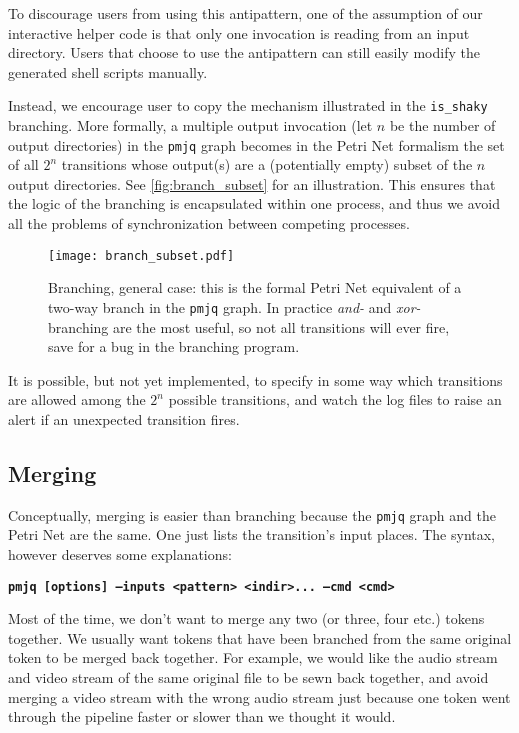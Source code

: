 \documentclass[letterpaper,twocolumn,10pt]{article}
\begin{document}
To discourage users from using this antipattern, one of the assumption of our interactive helper code is that only one invocation is reading from an input directory. Users that choose to use the antipattern can still easily modify the generated shell scripts manually.

Instead, we encourage user to copy the mechanism illustrated in the {\tt is\_shaky} branching. More formally, a multiple output invocation (let $n$ be the number of output directories) in the {\tt pmjq} graph becomes in the Petri Net formalism the set of all $2^n$ transitions whose output(s) are a (potentially empty) subset of the $n$ output directories. See \autoref{fig:branch_subset} for an illustration. This ensures that the logic of the branching is encapsulated within one process, and thus we avoid all the problems of synchronization between competing processes.


\begin{figure}[t]
\begin{center}
\texttt{[image: branch\_subset.pdf]}
\end{center}
\caption{Branching, general case: this is the formal Petri Net equivalent of a two-way branch in the {\tt pmjq} graph. In practice \emph{and-} and \emph{xor-}branching are the most useful, so not all transitions will ever fire, save for a bug in the branching program.}
\label{fig:branch_subset}
\end{figure}

It is possible, but not yet implemented, to specify in some way which transitions are allowed among the $2^n$ possible transitions, and watch the log files to raise an alert if an unexpected transition fires.

\subsection{Merging}
\label{sec:merging}
Conceptually, merging is easier than branching because the {\tt pmjq} graph and the Petri Net are the same. One just lists the transition's input places. The syntax, however deserves some explanations:

{\bf \tt pmjq [options] --inputs <pattern> <indir>... --cmd <cmd> \\}

Most of the time, we don't want to merge any two (or three, four etc.) tokens together. We usually want tokens that have been branched from the same original token to be merged back together. For example, we would like the audio stream and video stream of the same original file to be sewn back together, and avoid merging a video stream with the wrong audio stream just because one token went through the pipeline faster or slower than we thought it would.
\end{document}
